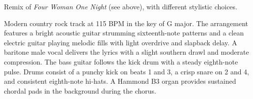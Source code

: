 

\begin{notes}
Remix of \emph{Four Woman One Night} (see above), with different stylistic choices.
\end{notes}

\begin{style}
Modern country rock track at 115 BPM in the key of G major. %
The arrangement features a bright acoustic guitar strumming sixteenth-note patterns and a clean electric guitar playing melodic fills with light overdrive and slapback delay. %
A baritone male vocal delivers the lyrics with a slight southern drawl and moderate compression. %
The bass guitar follows the kick drum with a steady eighth-note pulse. %
Drums consist of a punchy kick on beats 1 and 3, a crisp snare on 2 and 4, and consistent eighth-note hi-hats. %
A Hammond B3 organ provides sustained chordal pads in the background during the chorus.
\end{style}

